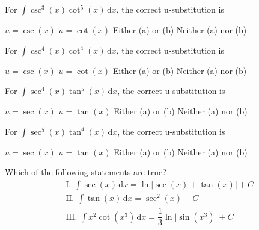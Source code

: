 \begin{questions}
    \question For $\int \csc^3 (x)\cot^5 (x) \,\mathrm{d}x$, the correct u-substitution is \\

    \begin{oneparchoices}
        \choice $u = \csc (x)$
        \choice $u = \cot (x)$
        \choice Either (a) or (b) 
        \choice Neither (a) nor (b)
    \end{oneparchoices} \par \horizontalline

    \question For $\int \csc^4 (x)\cot^4 (x) \,\mathrm{d}x$, the correct u-substitution is \\

    \begin{oneparchoices}
        \choice $u = \csc (x)$ 
        \choice $u = \cot (x)$
        \choice Either (a) or (b)
        \choice Neither (a) nor (b)
    \end{oneparchoices} \par \horizontalline

    \question For $\int \sec^4 (x)\tan^5 (x) \,\mathrm{d}x$, the correct u-substitution is \\

    \begin{oneparchoices}
        \choice $u = \sec (x)$ 
        \choice $u = \tan (x)$
        \choice Either (a) or (b)
        \choice Neither (a) nor (b)
    \end{oneparchoices} \par \horizontalline

    \question For $\int \sec^5 (x)\tan^4 (x) \,\mathrm{d}x$, the correct u-substitution is \\
    
    \begin{oneparchoices}
        \choice $u = \sec (x)$ 
        \choice $u = \tan (x)$
        \choice Either (a) or (b)
        \choice Neither (a) nor (b)
    \end{oneparchoices} \par \horizontalline

    \question Which of the following statements are true? \begin{align*}
        & \text{I. } \int \sec (x) \,\mathrm{d}x = \ln |\sec (x) + \tan (x)| + C \\[11pt]
        & \text{II. } \int \tan (x) \,\mathrm{d}x = \sec^2 (x) + C \\[11pt]
        & \text{III. } \int x^2\cot \left(x^3\right) \,\mathrm{d}x = \dfrac{1}{3}\ln \bigg|\sin \left(x^3\right)\bigg| + C
    \end{align*}


\end{questions}

